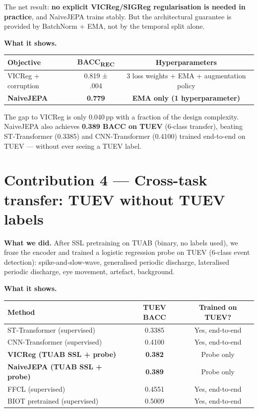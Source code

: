 \documentclass[11pt,a4paper]{article}
\begin{document}
The net result: \textbf{no explicit VICReg/SIGReg regularisation is needed
in practice}, and NaiveJEPA trains stably.  But the architectural guarantee
is provided by BatchNorm + EMA, not by the temporal split alone.

\textbf{What it shows.}
\begin{center}
\begin{tabular}{lcc}
\toprule
Objective & BACC\textsubscript{REC} & Hyperparameters \\
\midrule
VICReg + corruption & 0.819 ± .004 & 3 loss weights + EMA + augmentation policy \\
\textbf{NaiveJEPA} & \textbf{0.779} & \textbf{EMA only (1 hyperparameter)} \\
\bottomrule
\end{tabular}
\end{center}
The gap to VICReg is only 0.040\,pp with a fraction of the design complexity.
NaiveJEPA also achieves \textbf{0.389 BACC on TUEV} (6-class transfer),
beating ST-Transformer (0.3385) and CNN-Transformer (0.4100) trained
end-to-end on TUEV — without ever seeing a TUEV label.

\bigskip

\section{Contribution 4 — Cross-task transfer: TUEV without TUEV labels}

\textbf{What we did.}
After SSL pretraining on TUAB (binary, no labels used), we froze the encoder
and trained a logistic regression probe on TUEV (6-class event detection):
spike-and-slow-wave, generalised periodic discharge, lateralised periodic
discharge, eye movement, artefact, background.

\textbf{What it shows.}
\begin{center}
\begin{tabular}{lcc}
\toprule
Method & TUEV BACC & Trained on TUEV? \\
\midrule
ST-Transformer (supervised) & 0.3385 & Yes, end-to-end \\
CNN-Transformer (supervised) & 0.4100 & Yes, end-to-end \\
\midrule
\textbf{VICReg (TUAB SSL + probe)} & \textbf{0.382} & Probe only \\
\textbf{NaiveJEPA (TUAB SSL + probe)} & \textbf{0.389} & Probe only \\
\midrule
FFCL (supervised) & 0.4551 & Yes, end-to-end \\
BIOT pretrained (supervised) & 0.5009 & Yes, end-to-end \\
\bottomrule
\end{tabular}
\end{center}
\end{document}

